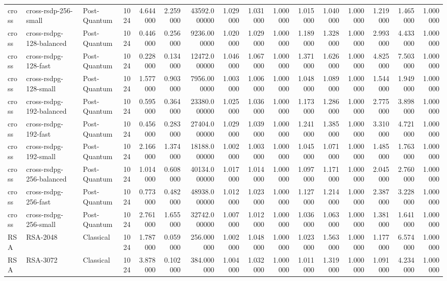 \begin{table}
\begin{tabular}{lllrrrrrrrrrrrrr}
cross & cross-rsdp-256-small & Post-Quantum & 1024 & 4.644000 & 2.259000 & 43592.000000 & 1.029000 & 1.031000 & 1.000000 & 1.015000 & 1.040000 & 1.000000 & 1.219000 & 1.465000 & 1.000000 \\
cross & cross-rsdpg-128-balanced & Post-Quantum & 1024 & 0.446000 & 0.256000 & 9236.000000 & 1.020000 & 1.029000 & 1.000000 & 1.189000 & 1.328000 & 1.000000 & 2.993000 & 4.433000 & 1.000000 \\
cross & cross-rsdpg-128-fast & Post-Quantum & 1024 & 0.228000 & 0.134000 & 12472.000000 & 1.046000 & 1.067000 & 1.000000 & 1.371000 & 1.626000 & 1.000000 & 4.825000 & 7.503000 & 1.000000 \\
cross & cross-rsdpg-128-small & Post-Quantum & 1024 & 1.577000 & 0.903000 & 7956.000000 & 1.003000 & 1.006000 & 1.000000 & 1.048000 & 1.089000 & 1.000000 & 1.544000 & 1.949000 & 1.000000 \\
cross & cross-rsdpg-192-balanced & Post-Quantum & 1024 & 0.595000 & 0.364000 & 23380.000000 & 1.025000 & 1.036000 & 1.000000 & 1.173000 & 1.286000 & 1.000000 & 2.775000 & 3.898000 & 1.000000 \\
cross & cross-rsdpg-192-fast & Post-Quantum & 1024 & 0.456000 & 0.283000 & 27404.000000 & 1.029000 & 1.039000 & 1.000000 & 1.241000 & 1.385000 & 1.000000 & 3.310000 & 4.721000 & 1.000000 \\
cross & cross-rsdpg-192-small & Post-Quantum & 1024 & 2.166000 & 1.374000 & 18188.000000 & 1.002000 & 1.003000 & 1.000000 & 1.045000 & 1.071000 & 1.000000 & 1.485000 & 1.763000 & 1.000000 \\
cross & cross-rsdpg-256-balanced & Post-Quantum & 1024 & 1.014000 & 0.608000 & 40134.000000 & 1.017000 & 1.014000 & 1.000000 & 1.097000 & 1.171000 & 1.000000 & 2.045000 & 2.760000 & 1.000000 \\
cross & cross-rsdpg-256-fast & Post-Quantum & 1024 & 0.773000 & 0.482000 & 48938.000000 & 1.012000 & 1.023000 & 1.000000 & 1.127000 & 1.214000 & 1.000000 & 2.387000 & 3.228000 & 1.000000 \\
cross & cross-rsdpg-256-small & Post-Quantum & 1024 & 2.761000 & 1.655000 & 32742.000000 & 1.007000 & 1.012000 & 1.000000 & 1.036000 & 1.063000 & 1.000000 & 1.381000 & 1.641000 & 1.000000 \\
RSA & RSA-2048 & Classical & 1024 & 1.787000 & 0.059000 & 256.000000 & 1.002000 & 1.048000 & 1.000000 & 1.023000 & 1.563000 & 1.000000 & 1.177000 & 6.574000 & 1.000000 \\
RSA & RSA-3072 & Classical & 1024 & 3.878000 & 0.102000 & 384.000000 & 1.004000 & 1.032000 & 1.000000 & 1.011000 & 1.319000 & 1.000000 & 1.091000 & 4.234000 & 1.000000 \\

\end{tabular}
\end{table}

